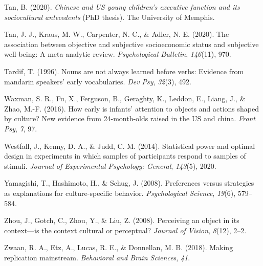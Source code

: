 \documentclass[
  man,floatsintext]{apa6}
\newlength{\cslhangindent}
\newlength{\cslentryspacingunit} %
\newenvironment{CSLReferences}[2] %
 {%
  \setlength{\parindent}{0pt}
  \ifodd #1
  \let\oldpar\par
  \def\par{\hangindent=\cslhangindent\oldpar}
  \fi
  \setlength{\parskip}{#2\cslentryspacingunit}
 }%
 {}
\begin{document}
\begin{CSLReferences}{1}{0}
\leavevmode{}%
Tan, B. (2020). \emph{Chinese and US young children's executive function and its sociocultural antecedents} (PhD thesis). The University of Memphis.

\leavevmode{}%
Tan, J. J., Kraus, M. W., Carpenter, N. C., \& Adler, N. E. (2020). The association between objective and subjective socioeconomic status and subjective well-being: A meta-analytic review. \emph{Psychological Bulletin}, \emph{146}(11), 970.

\leavevmode{}%
Tardif, T. (1996). Nouns are not always learned before verbs: Evidence from mandarin speakers' early vocabularies. \emph{Dev Psy}, \emph{32}(3), 492.

\leavevmode{}%
Waxman, S. R., Fu, X., Ferguson, B., Geraghty, K., Leddon, E., Liang, J., \& Zhao, M.-F. (2016). How early is infants' attention to objects and actions shaped by culture? New evidence from 24-month-olds raised in the US and china. \emph{Front Psy}, \emph{7}, 97.

\leavevmode{}%
Westfall, J., Kenny, D. A., \& Judd, C. M. (2014). Statistical power and optimal design in experiments in which samples of participants respond to samples of stimuli. \emph{Journal of Experimental Psychology: General}, \emph{143}(5), 2020.

\leavevmode{}%
Yamagishi, T., Hashimoto, H., \& Schug, J. (2008). Preferences versus strategies as explanations for culture-specific behavior. \emph{Psychological Science}, \emph{19}(6), 579--584.

\leavevmode{}%
Zhou, J., Gotch, C., Zhou, Y., \& Liu, Z. (2008). Perceiving an object in its context---is the context cultural or perceptual? \emph{Journal of Vision}, \emph{8}(12), 2--2.

\leavevmode{}%
Zwaan, R. A., Etz, A., Lucas, R. E., \& Donnellan, M. B. (2018). Making replication mainstream. \emph{Behavioral and Brain Sciences}, \emph{41}.

\end{CSLReferences}

\newpage

\newpage

\hypertarget{appendix-appendix}{%
\appendix}
\end{document}
